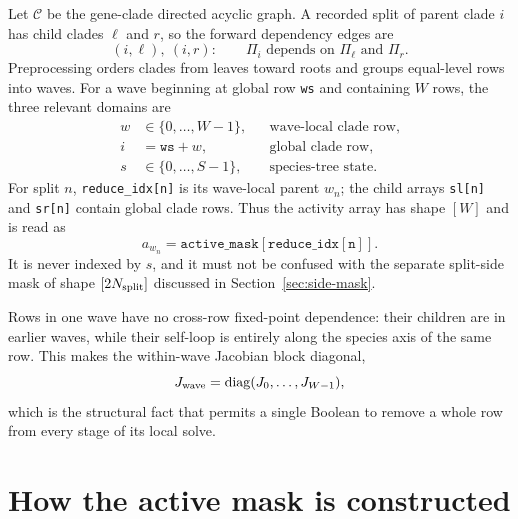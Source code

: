 \documentclass[11pt]{article}
\newcommand{\C}{\mathcal{C}}
\newcommand{\code}[1]{\nolinkurl{#1}}
\begin{document}
Let $\C$ be the gene-clade directed acyclic graph.  A recorded split of parent
clade $i$ has child clades $\ell$ and $r$, so the forward dependency edges are
\begin{equation}
  (i,\ell),\ (i,r):\qquad
  \Pi_i \text{ depends on } \Pi_\ell \text{ and } \Pi_r.
\end{equation}
Preprocessing orders clades from leaves toward roots and groups equal-level
rows into waves.  For a wave beginning at global row \code{ws} and containing
$W$ rows, the three relevant domains are
\begin{align}
  w &\in \{0,\ldots,W-1\}, &&\text{wave-local clade row},\\
  i &= \mathtt{ws}+w, &&\text{global clade row},\\
  s &\in \{0,\ldots,S-1\}, &&\text{species-tree state}.
\end{align}
For split $n$, \code{reduce\_idx[n]} is its wave-local parent $w_n$; the child
arrays \code{sl[n]} and \code{sr[n]} contain global clade rows.  Thus the
activity array has shape $[W]$ and is read as
\begin{equation}
  a_{w_n}=\mathtt{active\_mask[reduce\_idx[n]]}.
  \label{eq:index-contract}
\end{equation}
It is never indexed by $s$, and it must not be confused with the separate
split-side mask of shape $[2N_{\rm split}]$ discussed in
Section~\ref{sec:side-mask}.

Rows in one wave have no cross-row fixed-point dependence: their children are
in earlier waves, while their self-loop is entirely along the species axis of
the same row.  This makes the within-wave Jacobian block diagonal,
\begin{equation}
  J_{\rm wave}=\operatorname{diag}(J_0,\ldots,J_{W-1}),
  \label{eq:block-diagonal}
\end{equation}
which is the structural fact that permits a single Boolean to remove a whole
row from every stage of its local solve.

\section{How the active mask is constructed}
\end{document}
